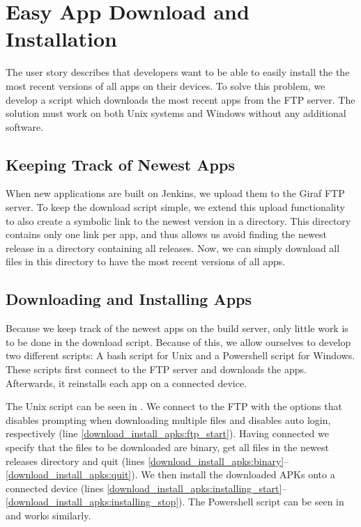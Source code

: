 \chapter{Easy App Download and Installation}
The user story  describes that developers want to be able to easily install the the most recent versions of all apps on their devices. To solve this problem, we develop a script which downloads the most recent apps from the FTP server. The solution must work on both Unix systems and Windows without any additional software.

\section{Keeping Track of Newest Apps}
When new applications are built on Jenkins, we upload them to the Giraf FTP server. To keep the download script simple, we extend this upload functionality to also create a symbolic link to the newest version in a  directory. This directory contains only one link per app, and thus allows us avoid finding the newest release in a directory containing all releases. Now, we can simply download all files in this directory to have the most recent versions of all apps.

\section{Downloading and Installing Apps}
Because we keep track of the newest apps on the build server, only little work is to be done in the download script. Because of this, we allow ourselves to develop two different scripts: A bash script for Unix and a Powershell script for Windows. These scripts first connect to the FTP server and downloads the apps. Afterwards, it reinstalls each app on a connected device.

The Unix script can be seen in . We connect to the FTP with the  options that disables prompting when downloading multiple files and disables auto login, respectively (line \ref{download_install_apks:ftp_start}). Having connected we specify that the files to be downloaded are binary, get all files in the newest releases directory and quit (lines \ref{download_install_apks:binary}--\ref{download_install_apks:quit}). We then install the downloaded APKs onto a connected device (lines \ref{download_install_apks:installing_start}--\ref{download_install_apks:installing_stop}). The Powershell script can be seen in  and works similarly.

